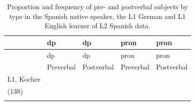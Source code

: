 \documentclass[
  letterpaper,
  DIV=11,
  numbers=noendperiod]{scrartcl}
\begin{document}
\begin{longtable}[]{@{}
  >{\raggedright\arraybackslash}p{}
  >{\centering\arraybackslash}p{}
  >{\centering\arraybackslash}p{}
  >{\centering\arraybackslash}p{}
  >{\centering\arraybackslash}p{}@{}}
\caption{Proportion and frequency of pre- and postverbal subjects by
type in the Spanish native speaker, the L1 German and L1 English learner
of L2 Spanish
data.}\label{tbl-subject-position-L2English}\tabularnewline
\toprule\noalign{}
\begin{minipage}[b]{\linewidth}\raggedright
\end{minipage} & \begin{minipage}[b]{\linewidth}\centering
dp
\end{minipage} & \begin{minipage}[b]{\linewidth}\centering
dp
\end{minipage} & \begin{minipage}[b]{\linewidth}\centering
pron
\end{minipage} & \begin{minipage}[b]{\linewidth}\centering
pron
\end{minipage} \\
\midrule\noalign{}
\endfirsthead
\toprule\noalign{}
\begin{minipage}[b]{\linewidth}\raggedright
\end{minipage} & \begin{minipage}[b]{\linewidth}\centering
dp
\end{minipage} & \begin{minipage}[b]{\linewidth}\centering
dp
\end{minipage} & \begin{minipage}[b]{\linewidth}\centering
pron
\end{minipage} & \begin{minipage}[b]{\linewidth}\centering
pron
\end{minipage} \\
\midrule\noalign{}
\endhead
\bottomrule\noalign{}
\endlastfoot
& Preverbal & Postverbal & Preverbal & Postverbal \\
L1, Kocher & \begin{minipage}[t]{\linewidth}\centering
77.5\%\\
(138)\\
\strut

\end{minipage}
\end{longtable}
\end{document}

